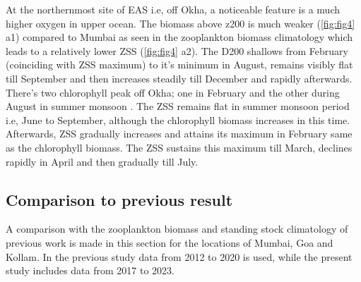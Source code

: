 \documentclass{article}
\begin{document}
	 At the northernmost site of EAS i.e, off Okha, a noticeable feature is a much higher oxygen in upper ocean. The biomass above z200 is much weaker (\cref{fig:fig4} a1) compared to Mumbai as seen in the zooplankton biomass climatology which leads to a relatively lower ZSS (\cref{fig:fig4} a2). The D200 shallows from February (coinciding with ZSS maximum) to it's minimum in August,  remains visibly flat till September and then increases steadily till December and rapidly afterwards. There's two chlorophyll peak off Okha; one in February \citep{keerthi2017physical} and the other during August in summer monsoon \citep{levy2007basin}. The ZSS remains flat in summer monsoon period i.e, June to September, although the chlorophyll biomass increases in this time. Afterwards, ZSS gradually increases and attains its maximum in February same as the chlorophyll biomass. The ZSS sustains this maximum till March, declines rapidly in April and then gradually till July.
	 
	\subsection{Comparison to previous result}	 
	A comparison with the zooplankton biomass and standing stock climatology of previous work \citep{aparna2022seasonal} is made in this section for the locations of Mumbai, Goa and Kollam. In the previous study data from 2012 to 2020 is used, while the present study includes data from 2017 to 2023.
	 
\end{document}
